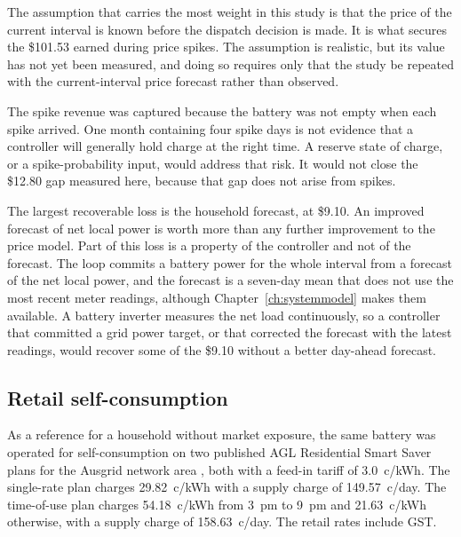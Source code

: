 The assumption that carries the most weight in this study is that the price of the
current interval is known before the dispatch decision is made. It is what secures the
\$101.53 earned during price spikes. The assumption is realistic, but its value has not
yet been measured, and doing so requires only that the study be repeated with the
current-interval price forecast rather than observed.

The spike revenue was captured because the battery was not empty when each spike
arrived. One month containing four spike days is not evidence that a controller will
generally hold charge at the right time. A reserve state of charge, or a
spike-probability input, would address that risk. It would not close the \$12.80 gap
measured here, because that gap does not arise from spikes.

The largest recoverable loss is the household forecast, at \$9.10. An improved forecast
of net local power is worth more than any further improvement to the price model. Part
of this loss is a property of the controller and not of the forecast. The loop commits a
battery power for the whole interval from a forecast of the net local power, and the
forecast is a seven-day mean that does not use the most recent meter readings, although
Chapter~\ref{ch:systemmodel} makes them available. A battery inverter measures the net
load continuously, so a controller that committed a grid power target, or that
corrected the forecast with the latest readings, would recover some of the \$9.10
without a better day-ahead forecast.

\subsection{Retail self-consumption}
\label{sec:results:retail}

As a reference for a household without market exposure, the same battery was operated
for self-consumption on two published AGL Residential Smart Saver plans for the Ausgrid
network area \cite{AGLSmartSaver}, %
both with a feed-in tariff of 3.0~c/kWh. The single-rate plan charges 29.82~c/kWh with a
supply charge of 149.57~c/day. The time-of-use plan charges 54.18~c/kWh from 3~pm to
9~pm and 21.63~c/kWh otherwise, with a supply charge of 158.63~c/day. The retail rates
include GST.

